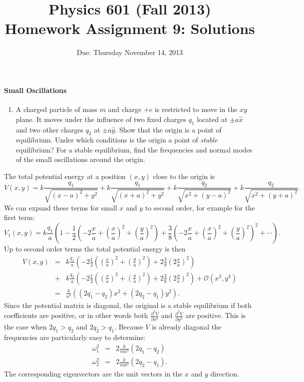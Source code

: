 \documentclass[letterpaper,11pt]{article}
\title{Physics 601 (Fall 2013) \\ Homework Assignment 9: Solutions}
\date{Due: Thursday November 14, 2013}
\begin{document}
\maketitle

\paragraph*{Small Oscillations}
\begin{enumerate}
 \item A charged particle of mass $m$ and charge $+e$ is restricted to move in the $xy$ plane.  It moves under the influence of two fixed charges $q_1$ located at $\pm a \hat{x}$ and two other charges $q_2$ at $\pm a \hat{y}$.  Show that the origin is a point of equilibrium.  Under which conditions is the origin a point of \emph{stable} equilibrium?  For a stable equilibrium, find the frequencies and normal modes of the small oscillations around the origin.
\end{enumerate}

The total potential energy at a position $(x,y)$ close to the origin is
\begin{equation*}
 V(x,y) = k \frac{q_1}{\sqrt{(x - a)^2 + y^2}} +  k \frac{q_1}{\sqrt{(x + a)^2 + y^2}} +  k \frac{q_2}{\sqrt{x^2 + (y - a)^2}} +  k \frac{q_2}{\sqrt{x^2 + (y + a)^2}}.
\end{equation*}
We can expand these terms for small $x$ and $y$ to second order, for example for the first term:
\begin{equation*}
 V_1(x,y) = k \frac{q_1}{a} \left(1 - \frac{1}{2} \left(- 2 \frac{x}{a} + \left(\frac{x}{a}\right)^2 + \left(\frac{y}{a}\right)^2 \right) + \frac{3}{8} \left(- 2 \frac{x}{a} + \left(\frac{x}{a}\right)^2 + \left(\frac{y}{a}\right)^2 \right)^2 + \cdots \right).
\end{equation*}
Up to second order terms the total potential energy is then
\begin{eqnarray*}
 V(x,y) & = & k \frac{q_1}{a} \left( - 2 \frac{1}{2} \left( \left(\frac{x}{a}\right)^2 + \left(\frac{y}{a}\right)^2 \right) + 2 \frac{3}{8} \left( 2 \frac{x}{a} \right)^2 \right) \\
 & + & k \frac{q_2}{a} \left( - 2 \frac{1}{2} \left( \left(\frac{x}{a}\right)^2 + \left(\frac{y}{a}\right)^2 \right) + 2 \frac{3}{8} \left( 2 \frac{y}{a} \right)^2 \right) + \mathcal{O}(x^3, y^3) \\
 & = & \frac{k}{a^3} \left( (2 q_1 - q_2) x^2 + (2 q_2 - q_1) y^2 \right).
\end{eqnarray*}
Since the potential matrix is diagonal, the original is a stable equilibrium if both coefficients are positive, or in other words both $\frac{\partial^2 V}{\partial x^2}$ and $\frac{\partial^2 V}{\partial y^2}$ are positive.  This is the case when $2 q_1 > q_2$ and $2 q_2 > q_1$.  Because $V$ is already diagonal the frequencies are particularly easy to determine:
\begin{eqnarray*}
 \omega_1^2 & = & 2 \frac{k}{m a^3} (2 q_1 - q_2) \\
 \omega_2^2 & = & 2 \frac{k}{m a^3} (2 q_2 - q_1).
\end{eqnarray*}
The corresponding eigenvectors are the unit vectors in the $x$ and $y$ direction.
\end{document}
